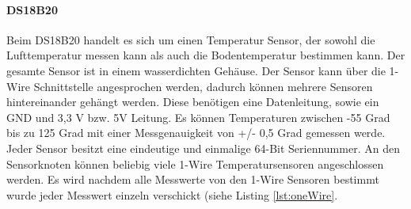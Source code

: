 \paragraph{DS18B20} Beim DS18B20 handelt es sich um einen Temperatur Sensor, der sowohl die Lufttemperatur messen kann als auch die Bodentemperatur bestimmen kann. Der gesamte Sensor ist in einem wasserdichten Gehäuse. Der Sensor kann über die 1-Wire Schnittstelle angesprochen werden, dadurch können mehrere Sensoren hintereinander gehängt werden. Diese benötigen eine Datenleitung, sowie ein GND und 3,3 V bzw. 5V Leitung. Es können Temperaturen zwischen  -55 Grad bis zu 125 Grad mit einer Messgenauigkeit von +/- 0,5 Grad gemessen werde. Jeder Sensor besitzt eine eindeutige und einmalige 64-Bit Seriennummer. An den Sensorknoten können beliebig viele 1-Wire Temperatursensoren angeschlossen werden. Es wird nachdem alle Messwerte von den 1-Wire Sensoren bestimmt wurde jeder Messwert einzeln verschickt (siehe Listing \ref{lst:oneWire}.

